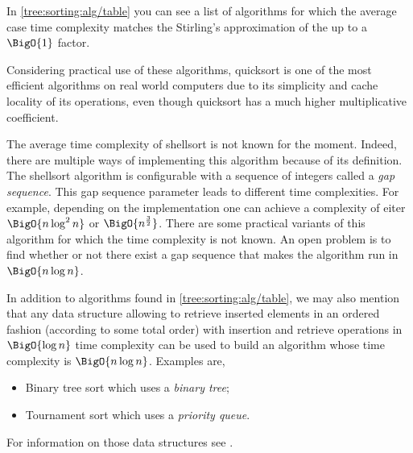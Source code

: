 In \ref{tree:sorting:alg/table} you can see a list of algorithms for which the
average case time complexity matches the Stirling's approximation of the
 up to a $\BigO{1}$ factor.

Considering practical use of these algorithms, quicksort is one of the most
efficient algorithms on real world computers due to its simplicity and cache
locality of its operations, even though quicksort has a much higher
multiplicative coefficient.

The average time complexity of shellsort is not known for the moment. Indeed,
there are multiple ways of implementing this algorithm because of its
definition. The shellsort algorithm is configurable with a sequence of integers
called a \emph{gap sequence}. This gap sequence parameter leads to different
time complexities. For example, depending on the implementation one can achieve
a complexity of eiter $\BigO{n \log^2 n}$ or $\BigO{n^{\frac{3}{2}}}$. There
are some practical variants of this algorithm for which the time complexity is
not known. An open problem is to find whether or not there exist a gap sequence
that makes the algorithm run in $\BigO{n \log n}$.

In addition to algorithms found in \ref{tree:sorting:alg/table}, we may also
mention that any data structure allowing to retrieve inserted elements in an
ordered fashion (according to some total order) with insertion and retrieve
operations in $\BigO{\log n}$ time complexity can be used to build an algorithm
whose time complexity is $\BigO{n \log n}$. Examples are,

\begin{itemize}
\item Binary tree sort which uses a \emph{binary tree};
\item Tournament sort which uses a \emph{priority queue}.
\end{itemize}

For information on those data structures see
\citet*{sleator1985self, leiserson2001introduction}.
